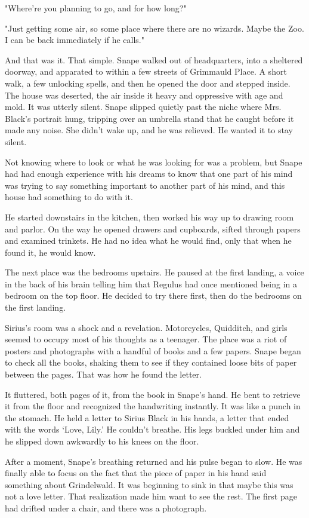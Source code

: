 "Where're you planning to go, and for how long?"

"Just getting some air, so some place where there are no wizards. Maybe the Zoo. I can be back immediately if he calls."

And that was it. That simple. Snape walked out of headquarters, into a sheltered doorway, and apparated to within a few streets of Grimmauld Place. A short walk, a few unlocking spells, and then he opened the door and stepped inside. The house was deserted, the air inside it heavy and oppressive with age and mold. It was utterly silent. Snape slipped quietly past the niche where Mrs. Black's portrait hung, tripping over an umbrella stand that he caught before it made any noise. She didn't wake up, and he was relieved. He wanted it to stay silent.

Not knowing where to look or what he was looking for was a problem, but Snape had had enough experience with his dreams to know that one part of his mind was trying to say something important to another part of his mind, and this house had something to do with it.

He started downstairs in the kitchen, then worked his way up to drawing room and parlor. On the way he opened drawers and cupboards, sifted through papers and examined trinkets. He had no idea what he would find, only that when he found it, he would know.

The next place was the bedrooms upstairs. He paused at the first landing, a voice in the back of his brain telling him that Regulus had once mentioned being in a bedroom on the top floor. He decided to try there first, then do the bedrooms on the first landing.

Sirius's room was a shock and a revelation. Motorcycles, Quidditch, and girls seemed to occupy most of his thoughts as a teenager. The place was a riot of posters and photographs with a handful of books and a few papers. Snape began to check all the books, shaking them to see if they contained loose bits of paper between the pages. That was how he found the letter.

It fluttered, both pages of it, from the book in Snape's hand. He bent to retrieve it from the floor and recognized the handwriting instantly. It was like a punch in the stomach. He held a letter to Sirius Black in his hands, a letter that ended with the words `Love, Lily.' He couldn't breathe. His legs buckled under him and he slipped down awkwardly to his knees on the floor.

After a moment, Snape's breathing returned and his pulse began to slow. He was finally able to focus on the fact that the piece of paper in his hand said something about Grindelwald. It was beginning to sink in that maybe this was not a love letter. That realization made him want to see the rest. The first page had drifted under a chair, and there was a photograph.

